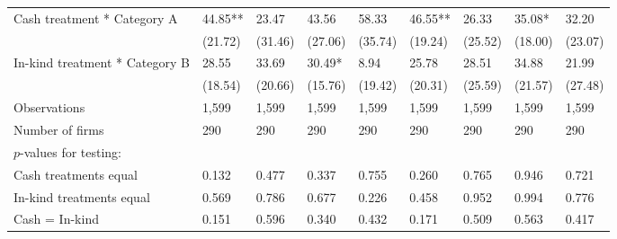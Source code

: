 \documentclass{report}
\begin{document}
\begin{table}[H]
{\begin{tabular}{lllllllll}
\hspace{1em}Cash treatment * Category A & 44.85** & 23.47 & 43.56 & 58.33 & 46.55** & 26.33 & 35.08* & 32.20\\
\hspace{1em} & (21.72) & (31.46) & (27.06) & (35.74) & (19.24) & (25.52) & (18.00) & (23.07)\\
\hspace{1em}In-kind treatment * Category B & 28.55 & 33.69 & 30.49* & 8.94 & 25.78 & 28.51 & 34.88 & 21.99\\
\hspace{1em} & (18.54) & (20.66) & (15.76) & (19.42) & (20.31) & (25.59) & (21.57) & (27.48)\\
\hspace{1em}Observations & 1,599 & 1,599 & 1,599 & 1,599 & 1,599 & 1,599 & 1,599 & 1,599\\
\hspace{1em}Number of firms & 290 & 290 & 290 & 290 & 290 & 290 & 290 & 290\\
\hspace{1em}$p$-values for testing: &  &  &  &  &  &  &  & \\
\hspace{1em}\hspace{1em} Cash treatments equal & 0.132 & 0.477 & 0.337 & 0.755 & 0.260 & 0.765 & 0.946 & 0.721\\
\hspace{1em}\hspace{1em} In-kind treatments equal & 0.569 & 0.786 & 0.677 & 0.226 & 0.458 & 0.952 & 0.994 & 0.776\\
\hspace{1em}\hspace{1em} Cash = In-kind & 0.151 & 0.596 & 0.340 & 0.432 & 0.171 & 0.509 & 0.563 & 0.417\\
\bottomrule
\end{tabular}}
\end{table}
\end{document}
